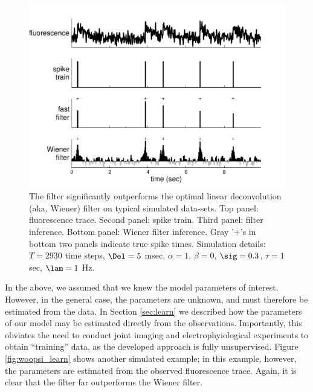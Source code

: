 \begin{figure}[h!]
\centering \includegraphics[width=.9\linewidth]{../figs/woopsi_inf}
\caption{The \foopsi filter significantly outperforms the optimal linear deconvolution (aka, Wiener) filter on typical simulated data-sets. Top panel: fluorescence trace.  Second panel: spike train.  Third panel: \foopsi filter inference.  Bottom panel: Wiener filter inference.  Gray '$+$'s in bottom two panels indicate true spike times.  Simulation details: $T=2930$ time steps, $\Del=5$ msec, $\alpha=1$, $\beta=0$, $\sig=0.3$, $\tau=1$ sec, $\lam=1$ Hz.} \label{fig:woopsi_inf}
\end{figure}


In the above, we assumed that we knew the model parameters of interest.  However, in the general case, the parameters are unknown, and must therefore be estimated from the data.  In Section \ref{sec:learn} we described how the parameters of our model may be estimated directly from the observations.  Importantly, this obviates the need to conduct joint imaging and electrophyiological experiments to obtain ``training'' data, as the developed approach is fully unsupervised.  Figure \ref{fig:woopsi_learn} shows another simulated example; in this example, however, the parameters are estimated from the observed fluorescence trace.  Again, it is clear that the \foopsi filter far outperforms the Wiener filter.

